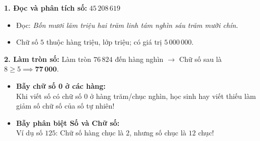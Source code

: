 \documentclass[14pt,a4paper,oneside]{extbook}
\begin{document}
\vspace{-2.5mm}
\noindent
\begin{minipage}[t]{0.49\textwidth}\vspace{0pt}
\begin{tcolorbox}[
  enhanced,
  colback=green!4!white,
  colframe=green!60!black,
  arc=2mm, boxrule=0.8pt,
  left=2mm, right=2mm, top=1.8mm, bottom=1.8mm,
  title={\footnotesize\bfseries\color{white}\faCheckCircle\ Ví dụ thực hành chuẩn mực}
]
{\footnotesize
\textbf{1. Đọc và phân tích số:} $45\,208\,619$
\begin{itemize}\setlength{\itemsep}{1pt}\setlength{\leftskip}{-2.5mm}
  \item Đọc: \textit{Bốn mươi lăm triệu hai trăm linh tám nghìn sáu trăm mười chín}.
  \item Chữ số $5$ thuộc hàng triệu, lớp triệu; có giá trị $5\,000\,000$.
\end{itemize}
\textbf{2. Làm tròn số:}
Làm tròn $76\,824$ đến hàng nghìn $\to$ Chữ số sau là $8 \ge 5 \implies \mathbf{77\,000}$.
}
\end{tcolorbox}
\end{minipage}
\hfill
\begin{minipage}[t]{0.49\textwidth}\vspace{0pt}
\begin{tcolorbox}[
  enhanced,
  colback=red!4!white,
  colframe=red!70!black,
  arc=2mm, boxrule=0.8pt,
  left=2mm, right=2mm, top=1.8mm, bottom=1.8mm,
  title={\footnotesize\bfseries\color{white}\faExclamationTriangle\ Mẹo tránh bẫy trắc nghiệm}
]
{\footnotesize
\begin{itemize}\setlength{\itemsep}{1.5pt}\setlength{\leftskip}{-2.5mm}
  \item \textbf{Bẫy chữ số 0 ở các hàng:}\\
  Khi viết số có chữ số 0 ở hàng trăm/chục nghìn, học sinh hay viết thiếu làm giảm số chữ số của số tự nhiên!
  \item \textbf{Bẫy phân biệt Số và Chữ số:}\\
  Ví dụ số $125$: Chữ số hàng chục là $2$, nhưng số chục là $12$ chục!
\end{itemize}
}
\end{tcolorbox}
\end{minipage}
\end{document}
